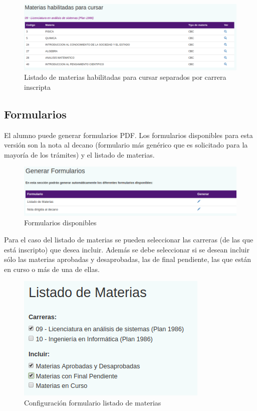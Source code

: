 \documentclass[a4paper]{article}
\begin{document}
\begin{figure}[H]
\centering
\includegraphics[scale=0.35]{Imagenes/que_puedo_cursar.png}\par
\caption{Listado de materias habilitadas para cursar separados por carrera inscripta}
\end{figure}

\subsection{Formularios}

El alumno puede generar formularios PDF. Los formularios disponibles para esta versión son la nota al decano (formulario más genérico que es solicitado para la mayoría de los trámites) y el listado de materias.

\begin{figure}[H]
\centering
\includegraphics[scale=0.4]{Imagenes/listado_formularios.png}\par
\caption{Formularios disponibles}
\end{figure}

Para el caso del listado de materias se pueden seleccionar las carreras (de las que está inscripto) que desea incluir. Además se debe seleccionar si se desean incluir sólo las materias aprobadas y desaprobadas, las de final pendiente, las que están en curso o más de una de ellas.

\begin{figure}[H]
\centering
\includegraphics[scale=0.5]{Imagenes/formulario_listado_materias.png}\par
\caption{Configuración formulario listado de materias}
\end{figure}
\end{document}
